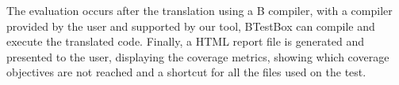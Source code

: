 \documentclass[runningheads]{llncs}
\begin{document}
The evaluation occurs after the translation using a B compiler, with a compiler provided by the user and supported by our tool, BTestBox can compile and execute the translated code. Finally, a HTML report file is generated and presented to the user, displaying the coverage metrics, showing which coverage objectives are not reached and a shortcut for all the files used on the test.

\end{document}
